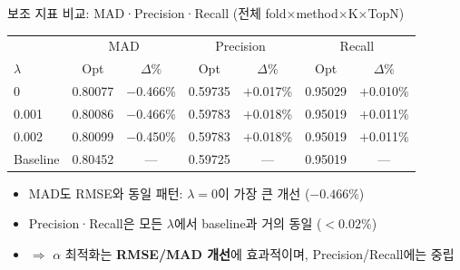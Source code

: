 \documentclass[aspectratio=169,10pt]{beamer}
\begin{document}
\begin{frame}{보조 지표 비교: MAD·Precision·Recall \textnormal{\small(전체 fold$\times$method$\times$K$\times$TopN)}}
	\begin{center}
	\renewcommand{\arraystretch}{1.3}
	\begin{tabular}{l|cc|cc|cc}
		\toprule
		& \multicolumn{2}{c|}{MAD} & \multicolumn{2}{c|}{Precision} & \multicolumn{2}{c}{Recall} \\
		$\lambda$ & Opt & $\Delta\%$ & Opt & $\Delta\%$ & Opt & $\Delta\%$ \\
		\midrule
		0        & 0.80077 & $-$0.466\% & 0.59735 & $+$0.017\% & 0.95029 & $+$0.010\% \\
		0.001    & 0.80086 & $-$0.466\% & 0.59783 & $+$0.018\% & 0.95019 & $+$0.011\% \\
		0.002    & 0.80099 & $-$0.450\% & 0.59783 & $+$0.018\% & 0.95019 & $+$0.011\% \\
		\midrule
		Baseline & 0.80452 & --- & 0.59725 & --- & 0.95019 & --- \\
		\bottomrule
	\end{tabular}
	\end{center}

	\vspace{0.3em}
	\begin{itemize}
		\item MAD도 RMSE와 동일 패턴: $\lambda=0$이 가장 큰 개선 ($-0.466\%$)
		\item Precision·Recall은 모든 $\lambda$에서 baseline과 거의 동일 ($<0.02\%$)
		\item $\Rightarrow$ $\alpha$ 최적화는 \textbf{RMSE/MAD 개선}에 효과적이며, Precision/Recall에는 중립
	\end{itemize}
\end{frame}
\end{document}
